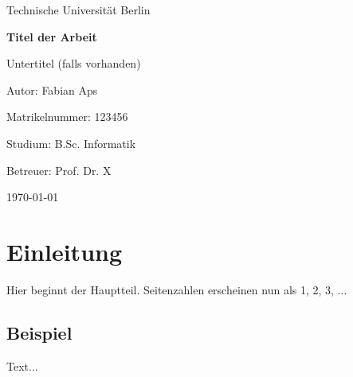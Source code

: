 \documentclass[12pt,a4paper]{report} %
\begin{document}
\begin{titlepage}
  \centering
  {\Large Technische Universität Berlin\par}
  \vspace{2cm}
  {\Huge\bfseries Titel der Arbeit\par}
  \vspace{1.5cm}
  {\Large Untertitel (falls vorhanden)\par}
  \vfill
  {\large Autor: Fabian Aps\par}
  {\large Matrikelnummer: 123456\par}
  {\large Studium: B.Sc. Informatik\par}
  \vspace{1cm}
  {\large Betreuer: Prof. Dr. X\par}
  \vspace{2cm}
  {\large \today\par}
  \thispagestyle{empty} %
\end{titlepage}

\cleardoublepage
{} %
\setcounter{page}{1}  %

\tableofcontents
\clearpage

\cleardoublepage
{}
\setcounter{page}{1}

\chapter{Einleitung}
Hier beginnt der Hauptteil. Seitenzahlen erscheinen nun als 1, 2, 3, ...

\section{Beispiel}
Text...
\end{document}
